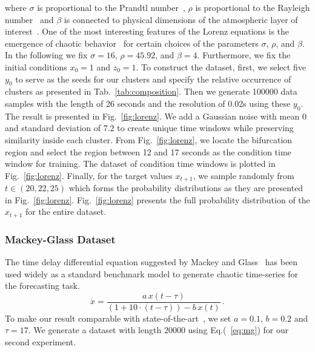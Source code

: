 \documentclass{ieeeaccess}
\begin{document}
where $\sigma$ is proportional to the Prandtl number~\cite{white2006viscous}, $\rho$ is proportional to the Rayleigh number~\cite{chandrasekhar2013hydrodynamic} and $\beta$ is connected to physical dimensions of the atmospheric layer of interest~\cite{sparrow2012lorenz}. One of the most interesting features of the Lorenz equations is the emergence of chaotic behavior~\cite{kellert1993wake,sparrow2012lorenz} for certain choices of the parameters $\sigma$, $\rho$, and $\beta$. In the following we fix $\sigma=16$, $\rho = 45.92$, and $\beta = 4$. Furthermore, we fix the initial conditions $x_0=1$ and $z_0=1$. To construct the dataset, first, we select five $y_0$ to serve as the seeds for our clusters and specify the relative occurrence of clusters as presented in Tab.~\ref{tab:composition}. Then we generate 100000 data samples with the length of 26 seconds and the resolution of 0.02s using these $y_0$. The result is presented in Fig.~\ref{fig:lorenz}. We add a Gaussian noise with mean $0$ and standard deviation of $7.2$ to create unique time windows while preserving similarity inside each cluster. From Fig.~\ref{fig:lorenz}, we locate the bifurcation region and select the region between 12 and 17 seconds as the condition time window for training. The dataset of condition time windows is plotted in Fig.~\ref{fig:lorenz}. Finally, for the target values $x_{t+1}$, we sample randomly from $t\in(20, 22,25)$ which forms the probability distributions as they are presented in Fig.~\ref{fig:lorenz}. Fig.~\ref{fig:lorenz} presents the full probability distribution of the $x_{t+1}$ for the entire dataset.

\subsubsection{Mackey-Glass Dataset}

The time delay differential equation suggested by Mackey and Glass~\cite{mackey1977oscillation} has been used widely as a standard benchmark model to generate chaotic time-series for the forecasting task.
\begin{equation}
\label{eq:mg}
\dot{x} = \frac{a\,x(t - \tau)}{(1 + 10\cdot(t - \tau)) - b\,x(t)} \,.
\end{equation}
To make our result comparable with state-of-the-art~\cite{mendez2017competitive}, we set $a = 0.1$, $b = 0.2$ and $\tau = 17$. We generate a dataset with length 20000 using Eq.(~\ref{eq:mg}) for our second experiment. 
\end{document}
